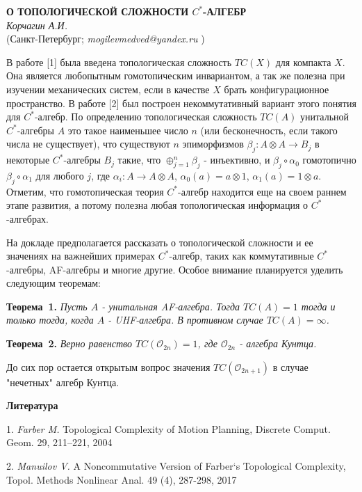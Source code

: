 \begin{center}{ \bf  О ТОПОЛОГИЧЕСКОЙ СЛОЖНОСТИ $C^*$-АЛГЕБР}\\
{\it Корчагин А.И. } \\
(Санкт-Петербург; {\it mogilevmedved@yandex.ru} )
\end{center}


В работе [1] была введена топологическая сложность $TC(X)$ для компакта $X$. Она является любопытным гомотопическим инвариантом, а так же полезна при изучении механических систем, если в качестве $X$ брать конфигурационное пространство. В работе [2] был построен некоммутативный вариант этого понятия для $C^*$-алгебр. По определению топологическая сложность $TC(A)$ унитальной $C^*$-алгебры $A$ это такое наименьшее число $n$ (или бесконечность, если такого числа не существует), что существуют $n$ эпиморфизмов $\beta_j:A\otimes A\to B_j$ в некоторые $C^*$-алгебры $B_j$ такие, что $\oplus_{j=1}^n\beta_j$ - инъективно, и $\beta_j\circ\alpha_0$ гомотопично $\beta_j\circ\alpha_1$ для любого $j$, где $\alpha_i:A\to A\otimes A$, $\alpha_0(a)=a\otimes1$, $\alpha_1(a)=1\otimes a$. Отметим, что гомотопическая теория $C^*$-алгебр находится еще на своем раннем этапе развития, а потому полезна любая топологическая информация о $C^*$-алгебрах.

На докладе предполагается рассказать о топологической сложности и ее значениях на важнейших примерах $C^*$-алгебр, таких как коммутативные $C^*$-алгебры, AF-алгебры и многие другие. Особое внимание планируется уделить следующим теоремам:

\textbf{Теорема~1.} {\it Пусть $A$ - унитальная AF-алгебра. Тогда $TC(A)=1$ тогда и только тогда, когда $A$ - UHF-алгебра. В противном случае $TC(A)=\infty$.}

\textbf{Теорема~2.} {\it Верно равенство $TC(\mathcal{O}_{2n})=1$, где $\mathcal{O}_{2n}$ - алгебра Кунтца.}

До сих пор остается открытым вопрос значения $TC(\mathcal{O}_{2n+1})$ в случае "нечетных" алгебр Кунтца.

\begin{center}

\end{center}



\smallskip \centerline{\bf Литература}\nopagebreak

1. {\it Farber M.} Topological Complexity of Motion Planning, Discrete Comput. Geom. 29, 211–221, 2004

2. {\it Manuilov V.} A Noncommutative Version of Farber`s Topological Complexity, Topol. Methods Nonlinear
Anal. 49 (4), 287-298, 2017
